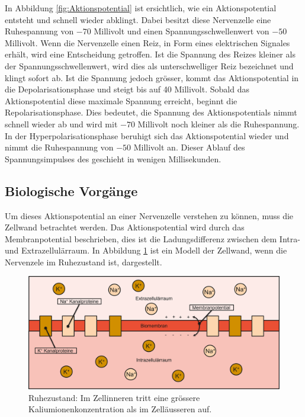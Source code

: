 \begin{refsection}
In Abbildung \ref{fig:Aktionspotential} ist ersichtlich, wie ein Aktionspotential entsteht und schnell wieder abklingt.
Dabei besitzt diese Nervenzelle eine Ruhespannung von $-70$ Millivolt und einen Spannungsschwellenwert von $-50$ Millivolt.
Wenn die Nervenzelle einen Reiz, in Form eines elektrischen Signales erhält, wird eine Entscheidung getroffen. 
Ist die Spannung des Reizes kleiner als der Spannungsschwellenwert, wird dies als unterschwelliger Reiz bezeichnet und klingt sofort ab.
Ist die Spannung jedoch grösser, kommt das Aktionspotential in die Depolarisationsphase und steigt bis auf 40 Millivolt.
Sobald das Aktionspotential diese maximale Spannung erreicht, beginnt die Repolarisationsphase.
Dies bedeutet, die Spannung des Aktionspotentials nimmt schnell wieder ab und wird mit $-70$ Millivolt noch kleiner als die Ruhespannung.
In der Hyperpolarisationsphase beruhigt sich das Aktionspotential wieder und nimmt die Ruhespannung von $-50$ Millivolt an.
Dieser Ablauf des Spannungsimpulses des geschieht in wenigen Millisekunden.

\subsection{Biologische Vorgänge}
Um dieses Aktionspotential an einer Nervenzelle verstehen zu können, muss die Zellwand betrachtet werden. 
Das Aktionspotential wird durch das Membranpotential beschrieben, dies ist die Ladungsdifferenz zwischen dem Intra- und
Extrazellulärraum.
In Abbildung \ref{fig:Ruhezustand} ist ein Modell der Zellwand, wenn die Nervenzele im Ruhezustand ist, dargestellt.
\begin{figure}[h]
    \centering
    \includegraphics[width=\textwidth]{papers/nerven/Bilder/Vorgang1.png}
    \caption{Ruhezustand: Im Zellinneren tritt eine grössere Kaliumionenkonzentration als im Zelläusseren auf.}
    \label{fig:Ruhezustand}
\end{figure}


\end{refsection}
